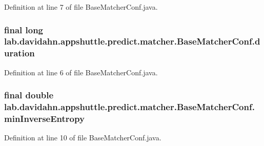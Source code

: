 \-Definition at line 7 of file \-Base\-Matcher\-Conf.\-java.

\hypertarget{classlab_1_1davidahn_1_1appshuttle_1_1predict_1_1matcher_1_1_base_matcher_conf_a885c5754c624276a3618af9d284777e7}{
\subsubsection[{duration}]{\setlength{\rightskip}{0pt plus 5cm}final long {\bf lab.\-davidahn.\-appshuttle.\-predict.\-matcher.\-Base\-Matcher\-Conf.\-duration}}}\label{classlab_1_1davidahn_1_1appshuttle_1_1predict_1_1matcher_1_1_base_matcher_conf_a885c5754c624276a3618af9d284777e7}


\-Definition at line 6 of file \-Base\-Matcher\-Conf.\-java.

\hypertarget{classlab_1_1davidahn_1_1appshuttle_1_1predict_1_1matcher_1_1_base_matcher_conf_a3338fe8b2a1f0efc2732e34264c28fd4}{
\subsubsection[{min\-Inverse\-Entropy}]{\setlength{\rightskip}{0pt plus 5cm}final double {\bf lab.\-davidahn.\-appshuttle.\-predict.\-matcher.\-Base\-Matcher\-Conf.\-min\-Inverse\-Entropy}}}\label{classlab_1_1davidahn_1_1appshuttle_1_1predict_1_1matcher_1_1_base_matcher_conf_a3338fe8b2a1f0efc2732e34264c28fd4}


\-Definition at line 10 of file \-Base\-Matcher\-Conf.\-java.

